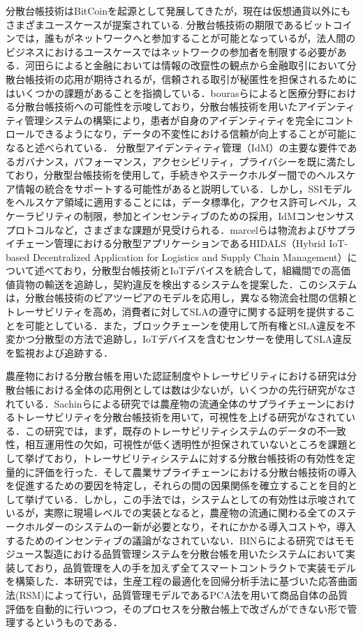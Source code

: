 \documentclass[11pt,dvipdfmx]{jreport}
\begin{document}
分散台帳技術はBitCoinを起源として発展してきたが，現在は仮想通貨以外にもさまざまユースケースが提案されている\cite{weko_197995_1}\cite{hearth}\cite{buturyu}.
分散台帳技術の期限であるビットコインでは，誰もがネットワークへと参加することが可能となっているが，法人間のビジネスにおけるユースケースではネットワークの参加者を制限する必要がある．河田らによると金融においては情報の改竄性の観点から金融取引において分散台帳技術の応用が期待されるが，信頼される取引が秘匿性を担保されるためにはいくつかの課題があることを指摘している\cite{hearth}．bourasらによると医療分野における分散台帳技術への可能性を示唆しており，分散台帳技術を用いたアイデンティティ管理システムの構築により，患者が自身のアイデンティティを完全にコントロールできるようになり，データの不変性における信頼が向上することが可能になると述べられている．
分散型アイデンティティ管理（IdM）の主要な要件であるガバナンス，パフォーマンス，アクセシビリティ，プライバシーを既に満たしており，分散型台帳技術を使用して，手続きやステークホルダー間でのヘルスケア情報の統合をサポートする可能性があると説明している．しかし，SSIモデルをヘルスケア領域に適用することには，データ標準化，アクセス許可レベル，スケーラビリティの制限，参加とインセンティブのための採用，IdMコンセンサスプロトコルなど，さまざまな課題が見受けられる．marcelらは物流およびサプライチェーン管理における分散型アプリケーションであるHIDALS（Hybrid IoT-based Decentralized Application for Logistics and Supply Chain Management）について述べており，分散型台帳技術とIoTデバイスを統合して，組織間での高価値貨物の輸送を追跡し，契約違反を検出するシステムを提案した\cite{buturyu}．このシステムは，分散台帳技術のピアツーピアのモデルを応用し，異なる物流会社間の信頼とトレーサビリティを高め，消費者に対してSLAの遵守に関する証明を提供することを可能としている．また，ブロックチェーンを使用して所有権とSLA違反を不変かつ分散型の方法で追跡し，IoTデバイスを含むセンサーを使用してSLA違反を監視および追跡する．

農産物における分散台帳を用いた認証制度やトレーサビリティにおける研究は分散台帳における全体の応用例としては数は少ないが，いくつかの先行研究がなされている．Sachinらによる研究では農産物の流通全体のサプライチェーンにおけるトレーサビリティを分散台帳技術を用いて，可視性を上げる研究がなされている\cite{nousa}．この研究では，まず，既存のトレーサビリティシステムのデータの不一致性，相互運用性の欠如，可視性が低く透明性が担保されていないところを課題として挙げており，トレーサビリティシステムに対する分散台帳技術の有効性を定量的に評価を行った．そして農業サプライチェーンにおける分散台帳技術の導入を促進するための要因を特定し，それらの間の因果関係を確立することを目的として挙げている．しかし，この手法では，システムとしての有効性は示唆されているが，実際に現場レベルでの実装となると，農産物の流通に関わる全てのステークホルダーのシステムの一新が必要となり，それにかかる導入コストや，導入するためのインセンティブの議論がなされていない．BINらによる研究ではモモジュース製造における品質管理システムを分散台帳を用いたシステムにおいて実装しており，品質管理を人の手を加えず全てスマートコントラクトで実装モデルを構築した\cite{zyusu}．本研究では，生産工程の最適化を回帰分析手法に基づいた応答曲面法(RSM)によって行い，品質管理モデルであるPCA法を用いて商品自体の品質評価を自動的に行いつつ，そのプロセスを分散台帳上で改ざんができない形で管理するというものである．
\end{document}
